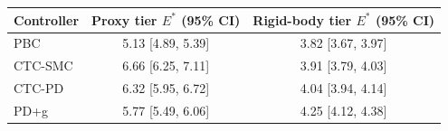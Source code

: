 \begin{tabular}{lcc}
\toprule
Controller & Proxy tier $E^{*}$ (95\% CI) & Rigid-body tier $E^{*}$ (95\% CI) \\
\midrule
PBC     & 5.13 [4.89, 5.39] & 3.82 [3.67, 3.97] \\
CTC-SMC & 6.66 [6.25, 7.11] & 3.91 [3.79, 4.03] \\
CTC-PD  & 6.32 [5.95, 6.72] & 4.04 [3.94, 4.14] \\
PD+g    & 5.77 [5.49, 6.06] & 4.25 [4.12, 4.38] \\
\bottomrule
\end{tabular}
